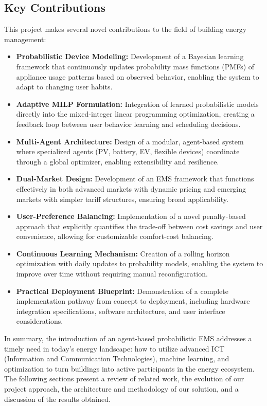 \documentclass[12pt,a4paper]{article}
\begin{document}
\subsection*{Key Contributions}
This project makes several novel contributions to the field of building energy management:
\begin{itemize}
    \item \textbf{Probabilistic Device Modeling:} Development of a Bayesian learning framework that continuously updates probability mass functions (PMFs) of appliance usage patterns based on observed behavior, enabling the system to adapt to changing user habits.
    \item \textbf{Adaptive MILP Formulation:} Integration of learned probabilistic models directly into the mixed-integer linear programming optimization, creating a feedback loop between user behavior learning and scheduling decisions.
    \item \textbf{Multi-Agent Architecture:} Design of a modular, agent-based system where specialized agents (PV, battery, EV, flexible devices) coordinate through a global optimizer, enabling extensibility and resilience.
    \item \textbf{Dual-Market Design:} Development of an EMS framework that functions effectively in both advanced markets with dynamic pricing and emerging markets with simpler tariff structures, ensuring broad applicability.
    \item \textbf{User-Preference Balancing:} Implementation of a novel penalty-based approach that explicitly quantifies the trade-off between cost savings and user convenience, allowing for customizable comfort-cost balancing.
    \item \textbf{Continuous Learning Mechanism:} Creation of a rolling horizon optimization with daily updates to probability models, enabling the system to improve over time without requiring manual reconfiguration.
    \item \textbf{Practical Deployment Blueprint:} Demonstration of a complete implementation pathway from concept to deployment, including hardware integration specifications, software architecture, and user interface considerations.
\end{itemize}
In summary, the introduction of an agent-based probabilistic EMS addresses a timely need in today’s energy landscape: how to utilize advanced ICT (Information and Communication Technologies), machine learning, and optimization to turn buildings into active participants in the energy ecosystem. The following sections present a review of related work, the evolution of our project approach, the architecture and methodology of our solution, and a discussion of the results obtained.
\end{document}
